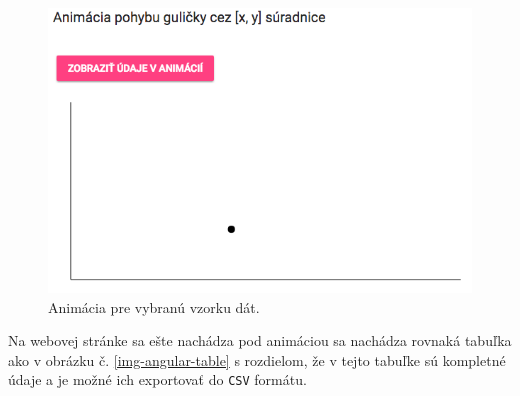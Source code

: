 \begin{figure}[H]
  \centering
  \includegraphics[scale=0.5]{img/code/angular-fulldata-animation.png}
  \caption{Animácia pre vybranú vzorku dát.}
  \label{img-angular-fulldata-graph}
\end{figure}

Na webovej stránke sa ešte nachádza pod animáciou sa nachádza rovnaká tabuľka ako v obrázku č. \ref{img-angular-table} s rozdielom, že v tejto tabuľke sú kompletné údaje a je možné ich exportovať do \verb|CSV| formátu.


